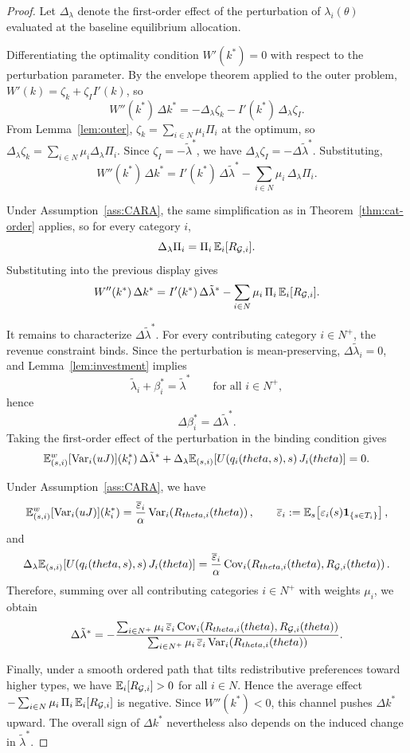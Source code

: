 \documentclass[master.tex]{subfiles}
\begin{document}
\begin{proof}
Let \(\Delta_\lambda\) denote the first-order effect of the perturbation of \(\lambda_i(\theta)\) evaluated at the baseline equilibrium allocation.

Differentiating the optimality condition $W'(k^\ast)=0$ with respect to the perturbation parameter. By the envelope theorem applied to the outer problem, $W'(k)=\zeta_k+\zeta_I I'(k)$, so
\[
W''(k^\ast)\,\Delta k^\ast = -\Delta_\lambda\zeta_k - I'(k^\ast)\,\Delta_\lambda\zeta_I.
\]
From Lemma~\ref{lem:outer}, $\zeta_k=\sum_{i\in N}\mu_i\Pi_i$ at the optimum, so $\Delta_\lambda\zeta_k=\sum_{i\in N}\mu_i\Delta_\lambda\Pi_i$. Since $\zeta_I=-\tilde\lambda^\ast$, we have $\Delta_\lambda\zeta_I=-\Delta\tilde\lambda^\ast$. Substituting,
\[
W''(k^\ast)\,\Delta k^\ast = I'(k^\ast)\,\Delta\tilde\lambda^\ast - \sum_{i\in N}\mu_i\,\Delta_\lambda\Pi_i.
\]

Under Assumption~\ref{ass:CARA}, the same simplification as in Theorem~\ref{thm:cat-order} applies, so for every category \(i\),
\[
\Delta_\lambda \Pi_i = \Pi_i\,\mathbb{E}_i[R_{\mathcal{G},i}].
\]
Substituting into the previous display gives
\[
W''(k^\ast)\,\Delta k^\ast = I'(k^\ast)\,\Delta\tilde\lambda^\ast - \sum_{i\in N}\mu_i\,\Pi_i\,\mathbb{E}_i[R_{\mathcal{G},i}].
\]

It remains to characterize \(\Delta\tilde\lambda^\ast\). For every contributing category \(i\in N^+\), the revenue constraint binds. Since the perturbation is mean-preserving, \(\Delta\tilde\lambda_i=0\), and Lemma~\ref{lem:investment} implies
\[
\tilde\lambda_i+\beta_i^\ast=\tilde\lambda^\ast \qquad\text{for all }i\in N^+,
\]
hence
\[
\Delta\beta_i^\ast=\Delta\tilde\lambda^\ast.
\]
Taking the first-order effect of the perturbation in the binding condition gives
\[
\mathbb{E}_{(s,i)}^w[\mathrm{Var}_i(uJ)](k_i^\ast)\,\Delta\tilde\lambda^\ast + \Delta_\lambda\mathbb{E}_{(s,i)}\!\left[U(q_i(theta,s),s)\,J_i(theta)\right] = 0.
\]

Under Assumption~\ref{ass:CARA}, we have
\[
\mathbb{E}_{(s,i)}^w[\mathrm{Var}_i(uJ)](k_i^\ast) = \frac{\overline\varepsilon_i}{\alpha}\,\mathrm{Var}_{i}\!\left(R_{theta,i}(theta)\right), \qquad \overline\varepsilon_i := \mathbb{E}_s\!\left[\varepsilon_i(s)\mathbf 1_{\{s\in T_i\}}\right],
\]
and
\[
\Delta_\lambda\mathbb{E}_{(s,i)}\!\left[U(q_i(theta,s),s)\,J_i(theta)\right] = \frac{\overline\varepsilon_i}{\alpha}\,\mathrm{Cov}_{i}\!\left(R_{theta,i}(theta),R_{\mathcal{G},i}(theta)\right).
\]
Therefore, summing over all contributing categories \(i\in N^+\) with weights \(\mu_i\), we obtain
\[
\Delta\tilde\lambda^\ast = -\frac{\sum_{i\in N^+}\mu_i\,\overline\varepsilon_i\,\mathrm{Cov}_{i}\!\left(R_{theta,i}(theta),R_{\mathcal{G},i}(theta)\right)}{\sum_{i\in N^+}\mu_i\,\overline\varepsilon_i\,\mathrm{Var}_{i}\!\left(R_{theta,i}(theta)\right)}.
\]

Finally, under a smooth ordered path that tilts redistributive preferences toward higher types, we have $\mathbb{E}_i[R_{\mathcal{G},i}]>0$ for all $i\in N$. Hence the average effect $-\sum_{i\in N}\mu_i\,\Pi_i\,\mathbb{E}_i[R_{\mathcal{G},i}]$ is negative. Since \(W''(k^\ast)<0\), this channel pushes \(\Delta k^\ast\) upward. The overall sign of \(\Delta k^\ast\) nevertheless also depends on the induced change in \(\tilde\lambda^\ast\).
\end{proof}
\end{document}
